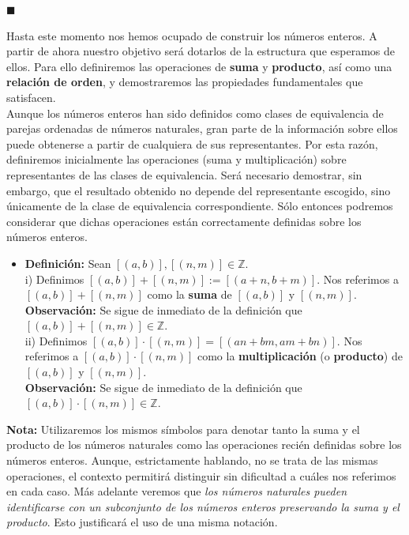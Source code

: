 \documentclass[10 pt]{article}
\begin{document}
\begin{flushright}
    $\blacksquare$
\end{flushright}

\Large{Hasta este momento nos hemos ocupado de construir los números enteros. A partir de ahora nuestro objetivo será dotarlos de la estructura que esperamos de ellos. Para ello definiremos las operaciones de \textbf{suma} y \textbf{producto}, así como una\textbf{ relación de orden}, y demostraremos las propiedades fundamentales que satisfacen.} \\

\Large{Aunque los números enteros han sido definidos como clases de equivalencia de parejas ordenadas de números naturales, gran parte de la información sobre ellos puede obtenerse a partir de cualquiera de sus representantes. Por esta razón, definiremos inicialmente las operaciones (suma y multiplicación) sobre representantes de las clases de equivalencia. Será necesario demostrar, sin embargo, que el resultado obtenido no depende del representante escogido, sino únicamente de la clase de equivalencia correspondiente. Sólo entonces podremos considerar que dichas operaciones están correctamente definidas sobre los números enteros.} \\

\begin{itemize}
    \item \Large{\textbf{Definición:} Sean $[(a,b)],[(n,m)] \in \mathbb Z$. \\

    i) Definimos $[(a,b)]+[(n,m)]:=[(a+n,b+m)]$. Nos referimos a $[(a,b)] + [(n,m)]$ como la \textbf{suma} de $[(a,b)]$ y $[(n,m)]$.  \\

    \textbf{Observación:} Se sigue de inmediato de la definición que $[(a,b)]+[(n,m)] \in \mathbb Z$. \\

    ii) Definimos $[(a,b)] \cdot [(n,m)]=[(an+bm,am+bn)]$. Nos referimos a $[(a,b)] \cdot [(n,m)]$ como la \textbf{multiplicación} (o \textbf{producto}) de $[(a,b)]$ y $[(n,m)]$. \\

    \textbf{Observación:} Se sigue de inmediato de la definición que $[(a,b)] \cdot [(n,m)] \in \mathbb Z$.} \\
\end{itemize}

\Large{\textbf{Nota:} Utilizaremos los mismos símbolos para denotar tanto la suma y el producto de los números naturales como las operaciones recién definidas sobre los números enteros. Aunque, estrictamente hablando, no se trata de las mismas operaciones, el contexto permitirá distinguir sin dificultad a cuáles nos referimos en cada caso. Más adelante veremos que \textit{los números naturales pueden identificarse con un subconjunto de los números enteros preservando la suma y el producto}. Esto justificará el uso de una misma notación.} \\
\end{document}
